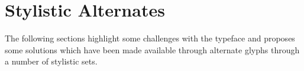 \newpage
\section{Stylistic Alternates}
The following sections highlight some challenges with the typeface and proposes
some solutions which have been made available through alternate glyphs through
a number of stylistic sets.




